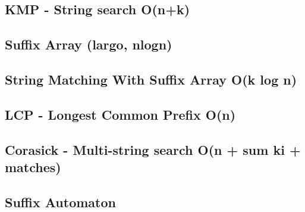 \subsection{KMP - String search O(n+k)}
\subsection{Suffix Array (largo, nlogn)} %
\subsection{String Matching With Suffix Array O(k log n)}
\subsection{LCP - Longest Common Prefix O(n)}
\subsection{Corasick - Multi-string search O(n + sum ki + matches)}
\subsection{Suffix Automaton}
